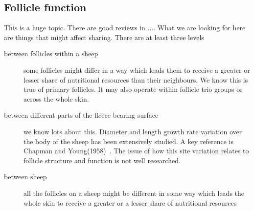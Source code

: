 \documentclass[titlepage]{article}  %
\begin{document}
\subsection{Follicle function}
This is a huge topic. There are good reviews in .... What we are looking for here are things that might affect sharing. There are at least three levels
\begin{description}
\item[between follicles within a sheep] some follicles might differ in a way which leads them to receive a greater or lesser share of nutritional resources than their neighbours. We know this is true of primary follicles. It may also operate within follicle trio groups or across the whole skin. 
\item[between different parts of the fleece bearing surface] we know lots about this. Diameter and length growth rate variation over the body of the sheep has been extensively studied. A key reference is Chapman and Young(1958)~\cite{chap:58}. The issue of how this site variation relates to follicle structure and function is not well researched.
\item[between sheep] all the follicles on a sheep might be different in some way which leads the whole skin to receive a greater or a lesser share of nutritional resources
\end{description}
\end{document}

